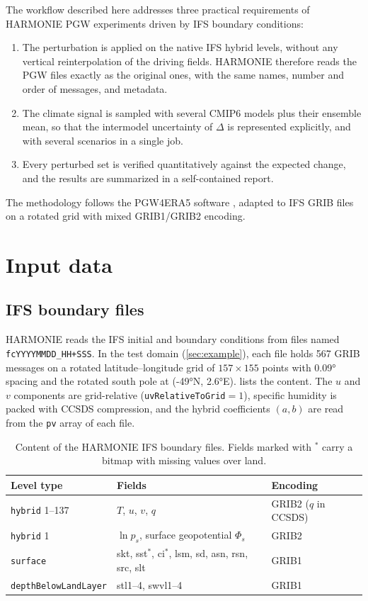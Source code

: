 \documentclass[11pt,a4paper]{article}
\newcommand{\code}[1]{\texttt{#1}}
\begin{document}
The workflow described here addresses three practical requirements of
HARMONIE PGW experiments driven by IFS boundary conditions:
\begin{enumerate}
  \item The perturbation is applied on the native IFS hybrid levels, without
    any vertical reinterpolation of the driving fields. HARMONIE therefore
    reads the PGW files exactly as the original ones, with the same names,
    number and order of messages, and metadata.
  \item The climate signal is sampled with several CMIP6 models plus their
    ensemble mean, so that the intermodel uncertainty of $\Delta$ is
    represented explicitly, and with several scenarios in a single job.
  \item Every perturbed set is verified quantitatively against the expected
    change, and the results are summarized in a self-contained report.
\end{enumerate}
The methodology follows the PGW4ERA5 software \citep{Brogli2023}, adapted to
IFS GRIB files on a rotated grid with mixed GRIB1/GRIB2 encoding.

\section{Input data}
\label{sec:data}

\subsection{IFS boundary files}

HARMONIE reads the IFS initial and boundary conditions from files named
\code{fcYYYYMMDD\_HH+SSS}. In the test domain (\cref{sec:example}), each file
holds 567 GRIB messages on a rotated latitude--longitude grid of
$157\times155$ points with \ang{0.09} spacing and the rotated south pole at
(\ang{-49}N, \ang{2.6}E).  lists the content. The $u$ and $v$
components are grid-relative (\code{uvRelativeToGrid}$=1$), specific humidity
is packed with CCSDS compression, and the hybrid coefficients $(a, b)$ are
read from the \code{pv} array of each file.

\begin{table}[htbp]
\centering
\caption{Content of the HARMONIE IFS boundary files. Fields marked with
$^{*}$ carry a bitmap with missing values over land.}
\label{tab:ifs}
\small
\begin{tabular}{lll}
\toprule
Level type & Fields & Encoding \\
\midrule
\code{hybrid} 1--137 & $T$, $u$, $v$, $q$ & GRIB2 ($q$ in CCSDS) \\
\code{hybrid} 1 & $\ln p_s$, surface geopotential $\Phi_s$ & GRIB2 \\
\code{surface} & skt, sst$^{*}$, ci$^{*}$, lsm, sd, asn, rsn, src, slt & GRIB1 \\
\code{depthBelowLandLayer} & stl1--4, swvl1--4 & GRIB1 \\
\bottomrule
\end{tabular}
\end{table}
\end{document}
